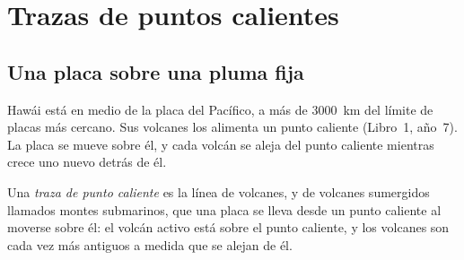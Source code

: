\section{Trazas de puntos calientes}

\subsection{Una placa sobre una pluma fija}

Hawái está en medio de la placa del Pacífico, a más de \qty{3000}{km}
del límite de placas más cercano.
 Sus volcanes los alimenta un punto caliente (Libro~1,
año~7). La placa se mueve sobre él, y cada volcán se aleja del punto caliente
mientras crece uno nuevo detrás de él.

\begin{definition}\label{def:g11:plate-motions:hotspot-track}
Una \emph{traza de punto caliente} es la línea
de volcanes, y de volcanes sumergidos llamados montes submarinos, que una
placa se lleva desde un punto caliente al moverse sobre él: el volcán activo
está sobre el punto caliente, y los volcanes son cada vez más antiguos a
medida que se alejan de él.
\end{definition}

